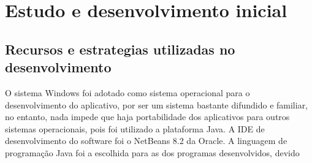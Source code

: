 \label{cap_3}

\section{Estudo e desenvolvimento inicial}


\subsection{Recursos e estrategias utilizadas no desenvolvimento}

	
O sistema  Windows foi adotado como sistema operacional para o desenvolvimento do aplicativo, por ser um sistema bastante difundido e familiar, no entanto, nada impede que haja portabilidade dos aplicativos para outros sistemas operacionais, pois foi utilizado a plataforma Java. A IDE de desenvolvimento do software foi o NetBeans 8.2 da  Oracle. A linguagem de programação Java foi a escolhida para as  dos programas desenvolvidos, devido




